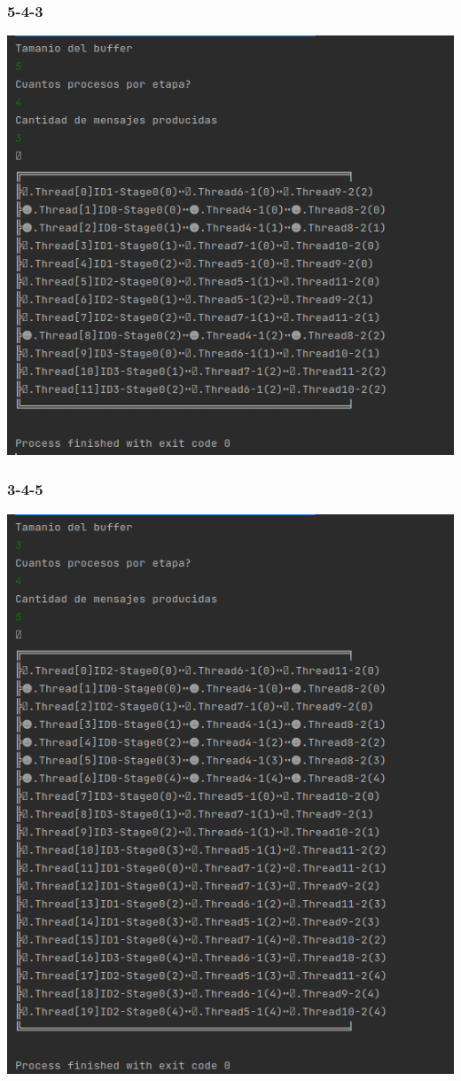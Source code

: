 \documentclass[a4paper]{article}
\begin{document}
    \subsubsection{5-4-3}
    \includegraphics{5-4-3.PNG}

    \subsubsection{3-4-5}
    \includegraphics{3-4-5.PNG}
\end{document}

